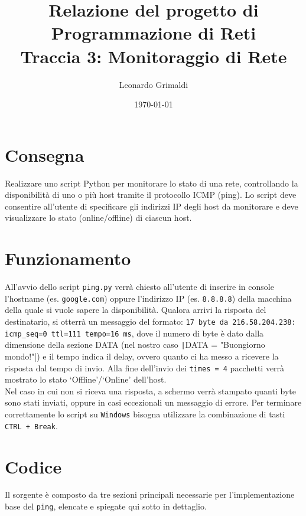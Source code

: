 \documentclass[a4paper,12pt]{report}
\title{Relazione del progetto di Programmazione di Reti 
    \\ Traccia 3: Monitoraggio di Rete}
\author{Leonardo Grimaldi}
\date{\today}
\begin{document}
\maketitle
\tableofcontents
\chapter{Consegna}
Realizzare uno script Python per monitorare lo stato di una rete, controllando la disponibilità di uno o più host tramite il protocollo ICMP (ping).
%
Lo script deve consentire all'utente di specificare gli indirizzi IP degli host da monitorare e deve visualizzare lo stato (online/offline) di ciascun host.
\chapter{Funzionamento}
All'avvio dello script \texttt{ping.py} verrà chiesto all'utente di inserire in console l'hostname (es. \texttt{google.com}) oppure l'indirizzo IP (es. \texttt{8.8.8.8}) della macchina della quale si vuole sapere la disponibilità.
%
Qualora arrivi la risposta del destinatario, si otterrà un messaggio del formato: \texttt{17 byte da 216.58.204.238: icmp\_seq=0 ttl=111 tempo=16 ms}, dove il numero di byte è dato dalla dimensione della sezione DATA (nel nostro caso \texttt|DATA = "Buongiorno mondo!"|) e il tempo indica il delay, ovvero quanto ci ha messo a ricevere la risposta dal tempo di invio.
%
Alla fine dell'invio dei \texttt{times = 4} pacchetti verrà mostrato lo stato `Offline'/`Online' dell'host.
%
\\ Nel caso in cui non si riceva una risposta, a schermo verrà stampato quanti byte sono stati inviati, oppure in casi eccezionali un messaggio di errore.
%
Per terminare correttamente lo script su \texttt{Windows} bisogna utilizzare la combinazione di tasti \texttt{CTRL + Break}.
\chapter{Codice}
Il sorgente è composto da tre sezioni principali necessarie per l'implementazione base del \texttt{ping}, elencate e spiegate qui sotto in dettaglio.
\end{document}
